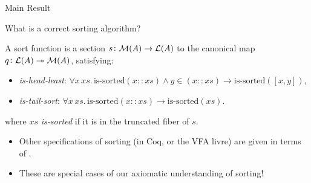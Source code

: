 \documentclass[9pt]{beamer}
\begin{document}
\begin{frame}{Main Result}

  \begin{qblock}
    What is a correct sorting algorithm?
  \end{qblock}

  \begin{pblock}[Answer]
  A sort function is a section $s\colon \mathcal{M}(A) \to \mathcal{L}(A)$ to the canonical map $q\colon \mathcal{L}(A) \twoheadrightarrow \mathcal{M}(A)$,
  satisfying:
  \begin{itemize}
      \item \textit{is-head-least}: $\forall x \, xs. \, \text{is-sorted}(x :: xs) \land y \in (x :: xs) \to \text{is-sorted}([x, y])$,
      \item \textit{is-tail-sort}: $\forall x \, xs. \, \text{is-sorted}(x :: xs) \to \text{is-sorted}(xs)$.
  \end{itemize}
  where $xs$ \textit{is-sorted} if it is in the truncated fiber of $s$.
  \end{pblock}

  \begin{tblock}[Remarks]
  \begin{itemize}
      \item Other specifications of sorting (in Coq, or the VFA livre) are given in terms of .
      \item These are special cases of our axiomatic understanding of sorting!
  \end{itemize}
  \end{tblock}
\end{frame}
\end{document}
